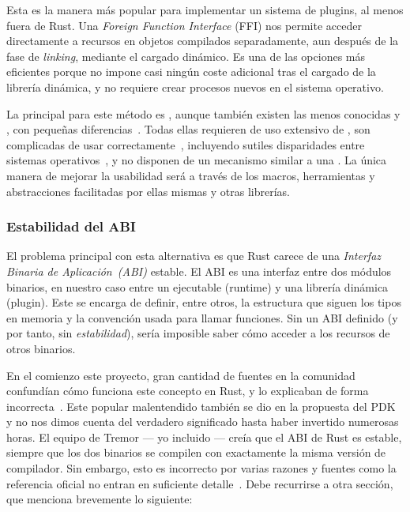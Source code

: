 Esta es la manera más popular para implementar un sistema de plugins, al menos
fuera de Rust. Una \emph{Foreign Function Interface} (FFI) nos permite acceder
directamente a recursos en objetos compilados separadamente, aun después de la
fase de \emph{linking}, mediante el cargado dinámico. Es una de las opciones más
eficientes porque no impone casi ningún coste adicional tras el cargado de la
librería dinámica, y no requiere crear procesos nuevos en el sistema operativo.

La \crate principal para este método es , aunque también
existen las menos conocidas  y , con
pequeñas diferencias~\cite{cratesdynloadcompare}. Todas ellas requieren de uso
extensivo de \unsafe, son complicadas de usar
correctamente~\cite{hardplugins1}\cite{hardplugins2}, incluyendo sutiles
disparidades entre sistemas operativos~\cite{hardplugins3}, y no disponen de un
mecanismo similar a una \sandbox. La única manera de mejorar la usabilidad será
a través de los macros, herramientas y abstracciones facilitadas por ellas
mismas y otras librerías.

\subsubsection{Estabilidad del ABI}\label{sec:abi}

El problema principal con esta alternativa es que Rust carece de una
\emph{Interfaz Binaria de Aplicación~(ABI)} estable. El ABI es una interfaz
entre dos módulos binarios, en nuestro caso entre un ejecutable (runtime) y una
librería dinámica (plugin). Este se encarga de definir, entre otros, la
estructura que siguen los tipos en memoria y la convención usada para llamar
funciones. Sin un ABI definido (y por tanto, sin \emph{estabilidad}), sería
imposible saber cómo acceder a los recursos de otros binarios.

En el comienzo este proyecto, gran cantidad de fuentes en la comunidad
confundían cómo funciona este concepto en Rust, y lo explicaban de forma
incorrecta~\cite{wrongabi1}\cite{wrongabi2}\cite{wrongabi3}\cite{wrongabi4}.
Este popular malentendido también se dio en la propuesta del PDK y no nos dimos
cuenta del verdadero significado hasta haber invertido numerosas horas. El
equipo de Tremor --- yo incluido --- creía que el ABI de Rust es estable,
siempre que los dos binarios se compilen con exactamente la misma versión de
compilador. Sin embargo, esto es incorrecto por varias razones y fuentes como la
referencia oficial no entran en suficiente detalle~\cite[Application Binary
Interface (ABI)]{rustref}. Debe recurrirse a otra sección, que menciona
brevemente lo siguiente:

